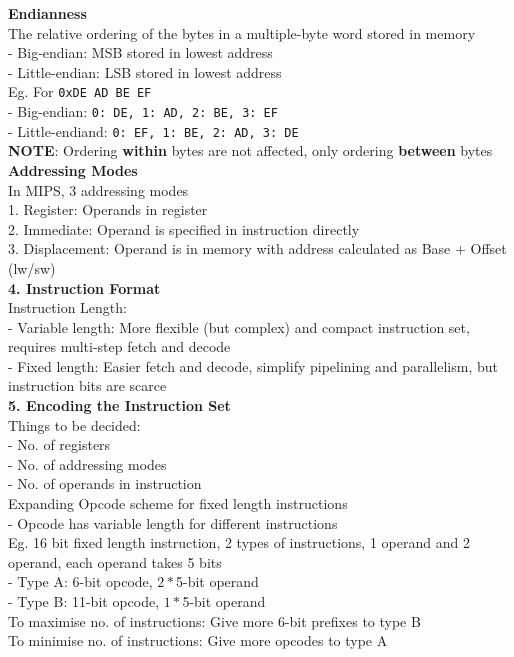 \documentclass[10pt, a4paper]{article}
\newcommand{\highlight}[1]{{\color{red}\textbf{#1}}}
\begin{document}
\begin{multicols*}{3}
		\textbf{Endianness}\\
		The relative ordering of the bytes in a multiple-byte word stored in memory\\
		- Big-endian: MSB stored in lowest address\\
		- Little-endian: LSB stored in lowest address\\
		Eg. For \texttt{0xDE AD BE EF}\\
		- Big-endian: \texttt{0: DE, 1: AD, 2: BE, 3: EF}\\
		- Little-endiand: \texttt{0: EF, 1: BE, 2: AD, 3: DE}\\
		\highlight{NOTE}: Ordering \textbf{within} bytes are not affected, only ordering \textbf{between} bytes\\
		
		\textbf{Addressing Modes}\\
		In MIPS, 3 addressing modes\\
		1. Register: Operands in register\\
		2. Immediate: Operand is specified in instruction directly\\
		3. Displacement: Operand is in memory with address calculated as Base + Offset (lw/sw)\\
		
		\textbf{4. Instruction Format}\\
		Instruction Length:\\
		- Variable length: More flexible (but complex) and compact instruction set, requires multi-step fetch and decode\\
		- Fixed length: Easier fetch and decode, simplify pipelining and parallelism, but instruction bits are scarce\\
		
		\textbf{5. Encoding the Instruction Set}\\
		Things to be decided:\\
		- No. of registers\\
		- No. of addressing modes\\
		- No. of operands in instruction\\
		Expanding Opcode scheme for fixed length instructions\\
		- Opcode has variable length for different instructions\\
		Eg. 16 bit fixed length instruction, 2 types of instructions, 1 operand and 2 operand, each operand takes 5 bits\\
		- Type A: 6-bit opcode, $2 *$5-bit operand\\
		- Type B: 11-bit opcode, $1*$5-bit operand\\
		To maximise no. of instructions: Give more 6-bit prefixes to type B\\
		To minimise no. of instructions: Give more opcodes to type A\\
		

\end{multicols*}
\end{document}
